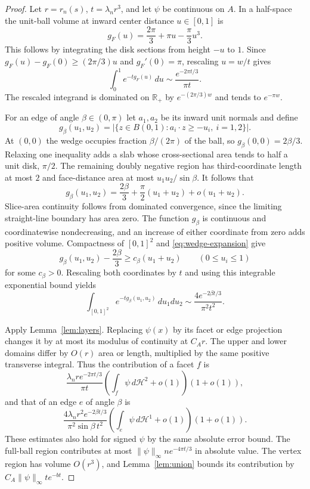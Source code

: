 \documentclass[11pt]{article}
\newcommand{\HH}{\mathcal H}
\newcommand{\norm}[1]{\lVert #1\rVert}
\begin{document}
\begin{proof}
Let $r=r_n(s)$, $t=\lambda_nr^3$, and let $\psi$ be continuous on $A$.
In a half-space the unit-ball volume at inward center distance $u\in[0,1]$
is
\[
 g_F(u)=\frac{2\pi}3+\pi u-\frac{\pi}3u^3.
\]
This follows by integrating the disk sections from height $-u$ to $1$.
Since $g_F(u)-g_F(0)\geq(2\pi/3)u$ and $g_F'(0)=\pi$, rescaling
$u=w/t$ gives
\begin{equation}\label{eq:face-laplace}
 \int_0^1e^{-tg_F(u)}\,du
 \sim\frac{e^{-2\pi t/3}}{\pi t}.
\end{equation}
The rescaled integrand is dominated on $\mathbb R_+$ by
$e^{-(2\pi/3)w}$ and tends to $e^{-\pi w}$.

For an edge of angle $\beta\in(0,\pi)$ let $a_1,a_2$ be its inward
unit normals and define
\[
 g_\beta(u_1,u_2)=
 \left|\{z\in B(0,1):a_i\cdot z\geq-u_i,\ i=1,2\}\right|.
\]
At $(0,0)$ the wedge occupies fraction $\beta/(2\pi)$ of the ball, so
$g_\beta(0,0)=2\beta/3$. Relaxing one inequality adds a slab whose
cross-sectional area tends to half a unit disk, $\pi/2$.
The remaining doubly negative region has third-coordinate length at most
$2$ and face-distance area at most $u_1u_2/\sin\beta$. It follows that
\begin{equation}\label{eq:wedge-expansion}
 g_\beta(u_1,u_2)=\frac{2\beta}3+
 \frac\pi2(u_1+u_2)+o(u_1+u_2).
\end{equation}
Slice-area continuity follows from dominated convergence, since the limiting
straight-line boundary has area zero. The function $g_\beta$ is continuous
and coordinatewise nondecreasing, and an increase of either coordinate
from zero adds positive volume. Compactness of $[0,1]^2$ and
\eqref{eq:wedge-expansion} give
\[
 g_\beta(u_1,u_2)-\frac{2\beta}3\geq c_\beta(u_1+u_2)
 \qquad(0\leq u_i\leq1)
\]
for some $c_\beta>0$. Rescaling both coordinates by $t$ and using this
integrable exponential bound yields
\begin{equation}\label{eq:edge-laplace}
 \int_{[0,1]^2}e^{-tg_\beta(u_1,u_2)}\,du_1du_2
 \sim\frac{4e^{-2\beta t/3}}{\pi^2t^2}.
\end{equation}

Apply Lemma~\ref{lem:layers}. Replacing $\psi(x)$ by its facet or edge
projection changes it by at most its modulus of continuity at $C_Ar$.
The upper and lower domains differ by $O(r)$ area or length, multiplied
by the same positive transverse integral. Thus the contribution of a
facet $f$ is
\begin{equation}\label{eq:face-contribution}
 \frac{\lambda_nr e^{-2\pi t/3}}{\pi t}
 \left(\int_f\psi\,d\HH^2+o(1)\right)(1+o(1)),
\end{equation}
and that of an edge $e$ of angle $\beta$ is
\begin{equation}\label{eq:edge-contribution}
 \frac{4\lambda_nr^2 e^{-2\beta t/3}}{\pi^2\sin\beta\,t^2}
 \left(\int_e\psi\,d\HH^1+o(1)\right)(1+o(1)).
\end{equation}
These estimates also hold for signed $\psi$ by the same absolute error
bound. The full-ball region contributes at most
$\norm{\psi}_\infty n e^{-4\pi t/3}$ in absolute value. The vertex
region has volume $O(r^3)$, and Lemma~\ref{lem:union} bounds its contribution
by $C_A\norm{\psi}_\infty t e^{-bt}$.


\end{proof}
\end{document}
